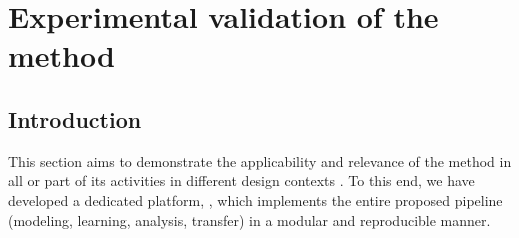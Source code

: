 \clearpage
\thispagestyle{empty}
\null
\newpage

\cleardoublepage
{}
\part{Experimental validation of the method}
\label{part:experimentation}

\clearpage
\thispagestyle{empty}
\null
\newpage



\chapter*{Introduction}

\noindent
This section aims to demonstrate the applicability and relevance of the  method in all or part of its activities in different  design contexts . To this end, we have developed a dedicated platform, , which implements the entire proposed pipeline (modeling, learning, analysis, transfer) in a modular and reproducible manner.

